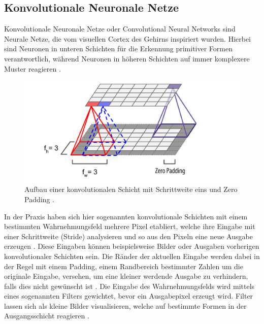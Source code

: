 \documentclass[twoside,a4paper]{IEEEtran}
\begin{document}
\subsection{Konvolutionale Neuronale Netze} %
Konvolutionale Neuronale Netze oder Convolutional Neural Networks sind Neurale Netze, die vom visuellen Cortex des Gehirns inspiriert wurden. Hierbei sind Neuronen in unteren Schichten für die Erkennung primitiver Formen verantwortlich, während Neuronen in höheren Schichten auf immer komplexere Muster reagieren \cite[S.360]{MACHINE_LEARNING}. 
\begin{figure}[!htb]
	\includegraphics[width=\columnwidth]{cnn}
	\caption{Aufbau einer konvolutionalen Schicht mit Schrittweite eins und Zero Padding \cite[S.362]{MACHINE_LEARNING}.}
	\label{bild1}
\end{figure}

In der Praxis haben sich hier sogenannten konvolutionale Schichten mit einem bestimmten Wahrnehmungsfeld mehrere Pixel etabliert, welche  ihre Eingabe mit einer Schrittweite (Stride) analysieren und so aus den Pixeln eine neue Ausgabe erzeugen \cite[S.361-363]{MACHINE_LEARNING}. Diese Eingaben können beispielsweise Bilder oder Ausgaben vorherigen konvolutionaler Schichten sein. Die Ränder der aktuellen Eingabe werden dabei in der Regel mit einem Padding, einem Randbereich bestimmter Zahlen um die originale Eingabe, versehen, um eine kleiner werdende Ausgabe zu verhindern, falls dies nicht gewünscht ist \cite[S.361-363]{MACHINE_LEARNING}. Die Eingabe des Wahrnehmungsfelds wird mittels eines sogenannten Filters gewichtet, bevor ein Ausgabepixel erzeugt wird. Filter lassen sich als kleine Bilder visualisieren, welche auf bestimmte Formen in der Ausgangsschicht reagieren \cite[S.363]{MACHINE_LEARNING}. 
\end{document}

